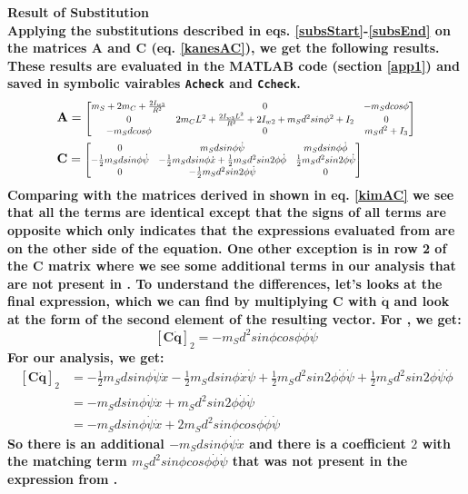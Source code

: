 \documentclass[a4paper,10pt]{article}
\newcommand\scalemath[2]{\scalebox{#1}{\mbox{\ensuremath{\displaystyle #2}}}}
\begin{document}
\bf{Result of Substitution}
\normalfont\\
Applying the substitutions described in eqs. \ref{subsStart}-\ref{subsEnd} on the matrices 
$\mathbf{A}$ and $\mathbf{C}$ (eq. \ref{kanesAC}), we get the following results. These results
are evaluated in the MATLAB code (section \ref{app1}) and saved in symbolic vairables \texttt{Acheck}
and \texttt{Ccheck}.
\begin{align} \begin{split}
 &\mathbf{A} = \scalemath{0.75}{\left[ \begin{matrix} m_S + 2m_C + \frac{2I_{w3}}{R^2} & 0 & -m_Sdcos\phi \\ 
   0 & 2m_CL^2 +\frac{2I_{w3}L^2}{R^2} + 2I_{w2} + m_Sd^2sin\phi^2 + I_2  & 0 \\
   -m_Sdcos\phi & 0  & m_Sd^2 + I_3 \end{matrix} \right]} \\
 &\mathbf{C} = \scalemath{0.75}{\left[ \begin{matrix} 0 & m_Sdsin\phi\dot{\psi} & m_Sdsin\phi\dot{\phi} \\ 
    -\frac{1}{2}m_Sdsin\phi\dot\psi & -\frac{1}{2}m_Sdsin\phi\dot{x}+\frac{1}{2}m_Sd^2sin2\phi\dot{\phi} & \frac{1}{2}m_Sd^2sin2\phi\dot{\psi} \\ 
    0 & -\frac{1}{2}m_Sd^2sin2\phi\dot{\psi} & 0 \end{matrix} \right]} \label{subsResult}
\end{split} \end{align}
Comparing with the matrices derived in \cite{kim2005dynamic} shown in eq. \ref{kimAC} we see that all the terms are 
identical except that the signs of all terms are opposite which only indicates that the expressions evaluated
from \cite{kim2005dynamic} are on the other side of the equation. One other exception is in row 2 of the 
$\mathbf{C}$ matrix where we see some additional terms in our analysis that are not present in \cite{kim2005dynamic}. 
To understand the differences, let's looks at the final expression, which we can find by multiplying $\mathbf{C}$ with $\mathbf{\dot{q}}$ 
and look at the form of the second element of the resulting vector.
For \cite{kim2005dynamic}, we get:
\[
 \left[\mathbf{C\dot{q}}\right]_2 = -m_Sd^2sin\phi cos\phi\dot\phi\dot\psi
\]
For our analysis, we get:
\begin{align}
 \left[\mathbf{C\dot{q}}\right]_2 &= -\frac{1}{2}m_Sdsin\phi\dot\psi\dot{x} -\frac{1}{2}m_Sdsin\phi\dot{x}\dot\psi+\frac{1}{2}m_Sd^2sin2\phi\dot{\phi}\dot\psi + \frac{1}{2}m_Sd^2sin2\phi\dot{\psi}\dot\phi \nonumber \\
 &= -m_Sdsin\phi\dot\psi\dot{x} + m_Sd^2sin2\phi\dot{\phi}\dot\psi \nonumber \\
 &= -m_Sdsin\phi\dot\psi\dot{x} + 2m_Sd^2sin\phi cos\phi\dot{\phi}\dot\psi \nonumber
\end{align}
So there is an additional $-m_Sdsin\phi\dot\psi\dot{x}$ and there is a coefficient $2$ with the matching term $m_Sd^2sin\phi cos\phi\dot{\phi}\dot\psi$
that was not present in the expression from \cite{kim2005dynamic}. 
\end{document}

